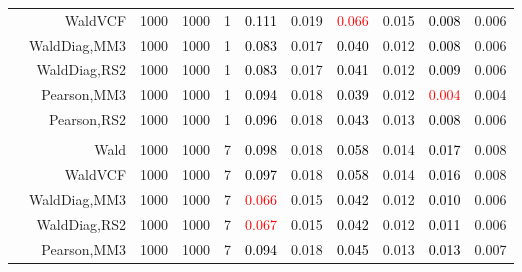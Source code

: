 \documentclass[
]{article}
\begin{document}
\begin{table}[H]
{\begin{tabular}[t]{lrrrrrrrlrr}
\hspace{1em} & WaldVCF & 1000 & 1000 & 1 & \textcolor{black}{0.111} & 0.019 & \textcolor{red}{0.066} & 0.015 & \textcolor{black}{0.008} & 0.006\\

\hspace{1em} & WaldDiag,MM3 & 1000 & 1000 & 1 & \textcolor{black}{0.083} & 0.017 & \textcolor{black}{0.040} & 0.012 & \textcolor{black}{0.008} & 0.006\\

\hspace{1em} & WaldDiag,RS2 & 1000 & 1000 & 1 & \textcolor{black}{0.083} & 0.017 & \textcolor{black}{0.041} & 0.012 & \textcolor{black}{0.009} & 0.006\\

\hspace{1em} & Pearson,MM3 & 1000 & 1000 & 1 & \textcolor{black}{0.094} & 0.018 & \textcolor{black}{0.039} & 0.012 & \textcolor{red}{0.004} & 0.004\\

\hspace{1em} & Pearson,RS2 & 1000 & 1000 & 1 & \textcolor{black}{0.096} & 0.018 & \textcolor{black}{0.043} & 0.013 & \textcolor{black}{0.008} & 0.006\\
\cmidrule{1-11}
\addlinespace[0.3em]
\multicolumn{11}{l}{\textbf{1F 15V}}\\
\hspace{1em} & Wald & 1000 & 1000 & 7 & \textcolor{black}{0.098} & 0.018 & \textcolor{black}{0.058} & 0.014 & \textcolor{black}{0.017} & 0.008\\

\hspace{1em} & WaldVCF & 1000 & 1000 & 7 & \textcolor{black}{0.097} & 0.018 & \textcolor{black}{0.058} & 0.014 & \textcolor{black}{0.016} & 0.008\\

\hspace{1em} & WaldDiag,MM3 & 1000 & 1000 & 7 & \textcolor{red}{0.066} & 0.015 & \textcolor{black}{0.042} & 0.012 & \textcolor{black}{0.010} & 0.006\\

\hspace{1em} & WaldDiag,RS2 & 1000 & 1000 & 7 & \textcolor{red}{0.067} & 0.015 & \textcolor{black}{0.042} & 0.012 & \textcolor{black}{0.011} & 0.006\\

\hspace{1em} & Pearson,MM3 & 1000 & 1000 & 7 & \textcolor{black}{0.094} & 0.018 & \textcolor{black}{0.045} & 0.013 & \textcolor{black}{0.013} & 0.007\\


\end{tabular}}
\end{table}
\end{document}
